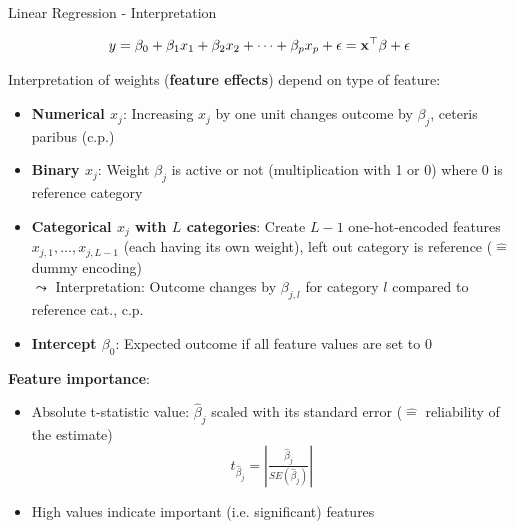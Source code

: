 \documentclass[11pt,compress,t,notes=noshow, aspectratio=169, xcolor=table]{beamer}
\begin{document}
\begin{frame}[c]{Linear Regression - Interpretation}

$$y = \beta_0 + \beta_1 x_1 + \beta_2 x_2 + \dots + \beta_p x_p + \epsilon = \xv^\top \beta + \epsilon$$

    Interpretation of weights (\textbf{feature effects}) depend on type of feature:
    \begin{itemize}
        \item \textbf{Numerical $x_j$}: Increasing $x_j$ by one unit changes outcome by $\beta_j$, ceteris paribus (c.p.)
        \pause
        \item \textbf{Binary $x_j$}: Weight $\beta_j$ is active or not (multiplication with 1 or 0) where 0 is reference category
        \pause
        \item %
        \textbf{Categorical $x_j$ with $L$ categories}: Create $L-1$ one-hot-encoded features $x_{j,1}, \hdots, x_{j,L-1}$ (each having its own weight), left out category is reference ($\hat =$ dummy encoding)
        \\
        $\leadsto$ Interpretation:
        Outcome changes by $\beta_{j,l}$ for category $l$ compared to reference cat.,  c.p.\pause
        \item \textbf{Intercept $\beta_0$}: Expected outcome if all feature values are set to 0 %
    \end{itemize}	
    \pause
    \textbf{Feature importance}:
    \begin{itemize}
        \item Absolute t-statistic value: $\hat\beta_j$ scaled with its standard error ($\hat =$ reliability of the estimate) 
    $$t_{\hat\beta_j} = \left| \tfrac{\hat\beta_j}{SE(\hat\beta_j)} \right|$$
        \item High values indicate important (i.e. significant) features
    \end{itemize}
\end{frame}
\end{document}
